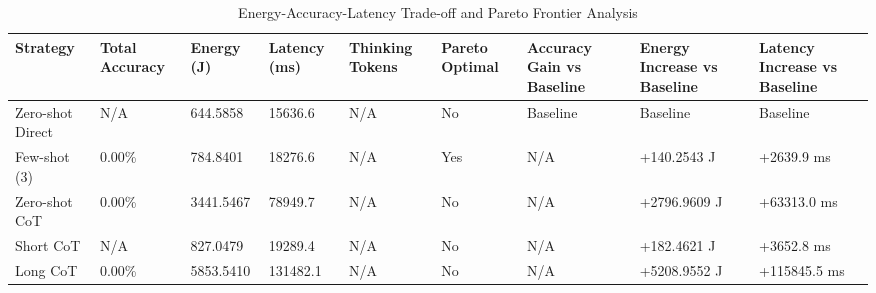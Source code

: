 \begin{table}
\caption{Energy-Accuracy-Latency Trade-off and Pareto Frontier Analysis}
\label{tab:tradeoff_comparison}
\begin{tabular}{lllllllll}
\toprule
Strategy & Total Accuracy & Energy (J) & Latency (ms) & Thinking Tokens & Pareto Optimal & Accuracy Gain vs Baseline & Energy Increase vs Baseline & Latency Increase vs Baseline \\
\midrule
Zero-shot Direct & N/A & 644.5858 & 15636.6 & N/A & No & Baseline & Baseline & Baseline \\
Few-shot (3) & 0.00\% & 784.8401 & 18276.6 & N/A & Yes & N/A & +140.2543 J & +2639.9 ms \\
Zero-shot CoT & 0.00\% & 3441.5467 & 78949.7 & N/A & No & N/A & +2796.9609 J & +63313.0 ms \\
Short CoT & N/A & 827.0479 & 19289.4 & N/A & No & N/A & +182.4621 J & +3652.8 ms \\
Long CoT & 0.00\% & 5853.5410 & 131482.1 & N/A & No & N/A & +5208.9552 J & +115845.5 ms \\
\bottomrule
\end{tabular}
\end{table}

